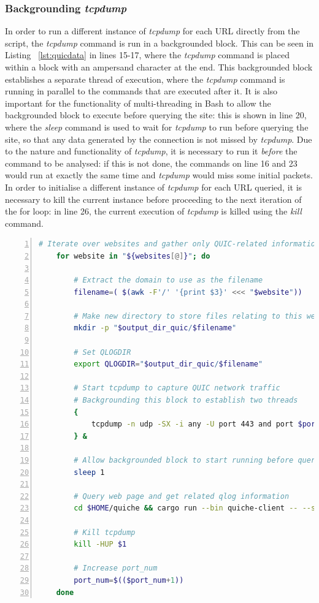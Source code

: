 \documentclass{l4proj}
\begin{document}
\subsubsection{Backgrounding \emph{tcpdump}} In order to run a different instance of \emph{tcpdump} for each URL directly from the script, the \emph{tcpdump} command is run in a backgrounded block. This can be seen in Listing ~\ref{lst:quicdata} in lines 15-17, where the \emph{tcpdump} command is placed within a block with an ampersand character at the end. This backgrounded block establishes a separate thread of execution, where the \emph{tcpdump} command is running in parallel to the commands that are executed after it. It is also important for the functionality of multi-threading in Bash to allow the backgrounded block to execute before querying the site: this is shown in line 20, where the \emph{sleep} command is used to wait for \emph{tcpdump} to run before querying the site, so that any data generated by the connection is not missed by \emph{tcpdump}. Due to the nature and functionality of \emph{tcpdump}, it is necessary to run it \emph{before} the command to be analysed: if this is not done, the commands on line 16 and 23 would run at exactly the same time and \emph{tcpdump} would miss some initial packets. In order to initialise a different instance of \emph{tcpdump} for each URL queried, it is necessary to kill the current instance before proceeding to the next iteration of the for loop: in line 26, the current execution of \emph{tcpdump} is killed using the \emph{kill} command.

\lstset{basicstyle=\footnotesize\ttfamily,breaklines=true}
\begin{lstlisting}[language=bash, numbers=left, float, caption={Code fragment from the Bash script \emph{packetCapture.sh}, showing the data collection performed to extract QUIC-related information.}, label=lst:quicdata]
    # Iterate over websites and gather only QUIC-related information
    for website in "${websites[@]}"; do
    
    	# Extract the domain to use as the filename
    	filename=( $(awk -F'/' '{print $3}' <<< "$website"))
    	
    	# Make new directory to store files relating to this webiste
    	mkdir -p "$output_dir_quic/$filename"
    	
    	# Set QLOGDIR
    	export QLOGDIR="$output_dir_quic/$filename"
    	
    	# Start tcpdump to capture QUIC network traffic 
    	# Backgrounding this block to establish two threads
    	{
    		tcpdump -n udp -SX -i any -U port 443 and port $port_num -w "$output_dir_quic/$filename/$filename-tcpdump.pcap"
    	} &
    
    	# Allow backgrounded block to start running before querying site
    	sleep 1
    	
    	# Query web page and get related qlog information
    	cd $HOME/quiche && cargo run --bin quiche-client -- --source-port $port_num --idle-timeout 1000 "$website"
    	
    	# Kill tcpdump
    	kill -HUP $1
    	
    	# Increase port_num
    	port_num=$(($port_num+1))
    done
\end{lstlisting}
\end{document}
